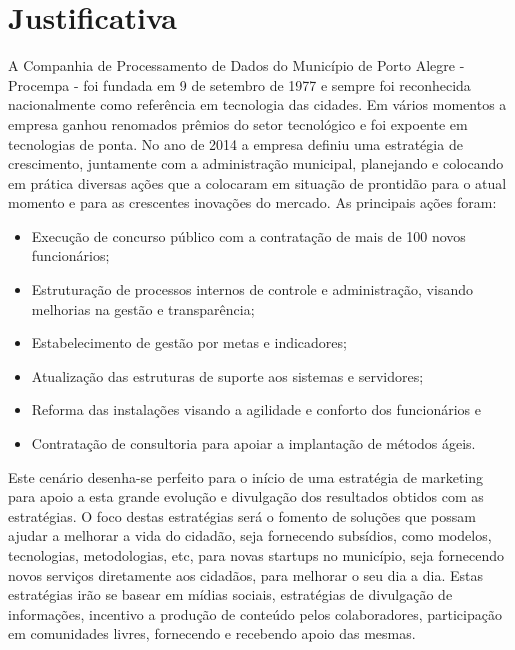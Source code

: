 \chapter{Justificativa}

A Companhia de Processamento de Dados do Município de Porto Alegre  - Procempa - foi fundada em 9 de setembro de 1977 e sempre foi reconhecida nacionalmente como referência em tecnologia das cidades. Em vários momentos a empresa ganhou renomados prêmios do setor tecnológico e foi expoente em tecnologias de ponta.
No ano de 2014 a empresa definiu uma estratégia de crescimento, juntamente com a administração municipal, planejando e colocando em prática diversas ações que a colocaram em situação de prontidão para o atual momento e para as crescentes inovações do mercado. As principais ações foram:

\begin{itemize}
\item Execução de concurso público com a contratação de mais de 100 novos funcionários;
\item Estruturação de processos internos de controle e administração, visando melhorias na gestão e transparência;
\item Estabelecimento de gestão por metas e indicadores;
\item Atualização das estruturas de suporte aos sistemas e servidores;
\item Reforma das instalações visando a agilidade e conforto dos funcionários e
\item Contratação de consultoria para apoiar a implantação de métodos ágeis.
\end{itemize}
Este cenário desenha-se perfeito para o início de uma estratégia de marketing para apoio a esta grande evolução e divulgação dos resultados obtidos com as estratégias. O foco destas estratégias será o fomento de soluções que possam ajudar a melhorar a vida do cidadão, seja fornecendo subsídios, como modelos, tecnologias, metodologias, etc, para novas startups no município, seja fornecendo novos serviços diretamente aos cidadãos, para melhorar o seu dia a dia.
Estas estratégias irão se basear em mídias sociais, estratégias de divulgação de informações, incentivo a produção de conteúdo pelos colaboradores, participação em comunidades livres, fornecendo e recebendo apoio das mesmas.
